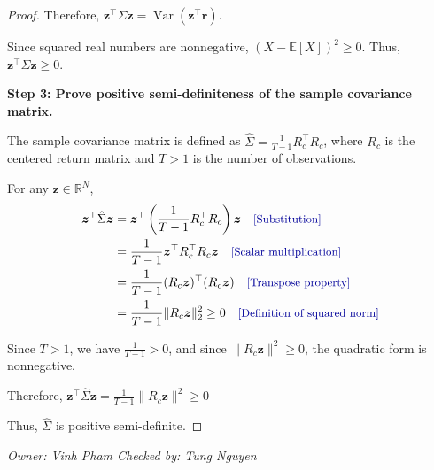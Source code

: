 \documentclass[11pt]{article}
\theoremstyle{plain}
\theoremstyle{definition}
\newcommand{\by}[1]{\quad\text{\small\color{blue!60!black}[#1]}}   %
\newcommand{\owner}[2]{\par\smallskip\noindent\textit{Owner: #1 \quad Checked by: #2}\par}
\begin{document}
\begin{proof}
Therefore,
$\bm z^\top\Sigma\bm z =\operatorname{Var}(\bm z^\top\bm r).$

Since squared real numbers are nonnegative,
$(X-\mathbb{E}[X])^2\ge 0.$
Thus, $\bm z^\top\Sigma\bm z\ge 0.$

\textbf{Step 3: Prove positive semi-definiteness
of the sample covariance matrix.}

The sample covariance matrix is defined as $\hat\Sigma=\frac{1}{T-1}R_c^\top R_c$,
where $R_c$ is the centered return matrix
and $T>1$ is the number of observations.

For any $\bm z\in\mathbb{R}^N$,
\begin{align*}
\bm z^\top\hat\Sigma\bm z
&=\bm z^\top
\left(\frac{1}{T-1}R_c^\top R_c\right)\bm z
\by{Substitution}\\
&=\frac{1}{T-1}
\bm z^\top R_c^\top R_c\bm z
\by{Scalar multiplication}\\
&=\frac{1}{T-1}
(R_c\bm z)^\top(R_c\bm z)
\by{Transpose property}\\
&=\frac{1}{T-1}\|R_c\bm z\|_2^2 \geq 0
\by{Definition of squared norm}\\
\end{align*}

Since $T>1$, we have $\frac{1}{T-1}>0$,
and since $\|R_c\bm z\|^2\geq0$,
the quadratic form is nonnegative.

Therefore, $\bm z^\top\hat\Sigma\bm z =\frac{1}{T-1}\|R_c\bm z\|^2\geq0$

Thus, $\hat\Sigma$ is positive semi-definite.
\end{proof}
\owner{Vinh Pham}{Tung Nguyen}
\end{document}
